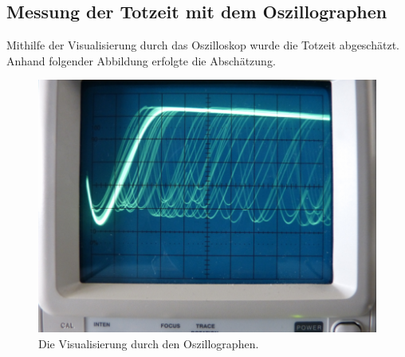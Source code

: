 \subsection{Messung der Totzeit mit dem Oszillographen}
  Mithilfe der Visualisierung durch das Oszilloskop wurde die Totzeit abgeschätzt. Anhand folgender
  Abbildung erfolgte die Abschätzung.
  \begin{figure}[H]
    \centering
      \includegraphics[scale=0.3]{content/Osz.png}
      \caption{Die Visualisierung durch den Oszillographen.}
      \label{fig:totzeit1}
  \end{figure}
